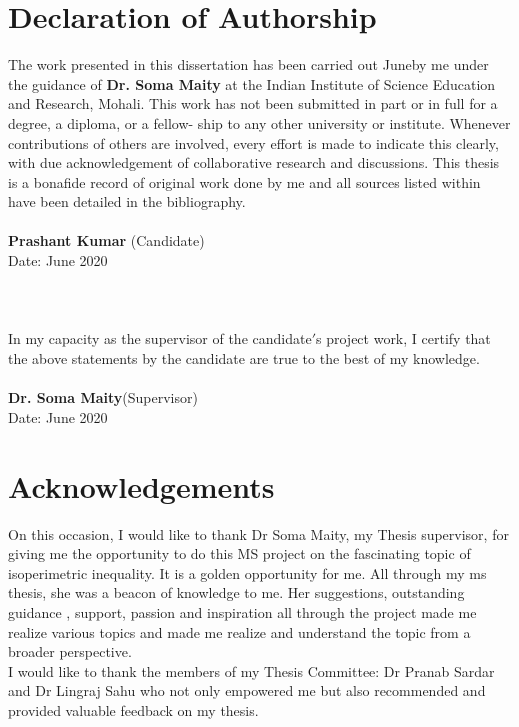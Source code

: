 \documentclass[oneside]{book}
\begin{document}
\chapter*{Declaration of Authorship}
The work presented in this dissertation has been carried out Juneby me under the guidance of \textbf{Dr. Soma Maity} at the Indian Institute of Science Education and Research, Mohali.
This work has not been submitted in part or in full for a degree, a diploma, or a fellow- ship to any other university or institute. Whenever contributions of others are involved, every effort is made to indicate this clearly, with due acknowledgement of collaborative research and discussions. This thesis is a bonafide record of original work done by me and all sources listed within have been detailed in the bibliography.\\
\\
\textbf{Prashant Kumar} (Candidate)\\
Date: June 2020\\
\\
\\
\\
In my capacity as the supervisor of the candidate$'$s project work, I certify that the above statements by the candidate are true to the best of my knowledge.\\
\\
\textbf{Dr. Soma Maity}(Supervisor)\\
Date: June 2020
\thispagestyle{empty}
\chapter*{Acknowledgements}

On this occasion, I would like to thank Dr Soma Maity, my Thesis supervisor, for giving me the opportunity to do this MS project on the fascinating topic of isoperimetric inequality. It is a golden opportunity for me. All through my ms thesis, she was a beacon of knowledge to me. 
Her suggestions, outstanding guidance , support, passion and inspiration all through the project made me realize various topics and made me realize and understand the topic from a broader perspective. \\ 

I would like to thank the members of my Thesis Committee: Dr Pranab Sardar and Dr Lingraj Sahu who not only empowered me but also recommended and provided valuable feedback on my thesis. \\
\end{document}
